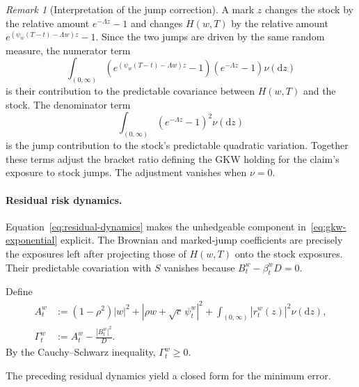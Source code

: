 \documentclass[11pt]{article}
\theoremstyle{definition}
\theoremstyle{remark}
\newtheorem{remark}[theorem]{Remark}
\newcommand{\1}{\mathbf{1}}
\newcommand{\dd}{\mathrm{d}}
\begin{document}

\begin{remark}[Interpretation of the jump correction]
A mark $z$ changes the stock by the relative amount $e^{-\Lambda z}-1$ and
changes $H(w,T)$ by the relative amount
$e^{(\psi_w(T-t)-\Lambda w)z}-1$. Since the two jumps are driven by the same
random measure, the numerator term
\[
 \int_{(0,\infty)}
   \left(e^{(\psi_w(T-t)-\Lambda w)z}-1\right)
   \left(e^{-\Lambda z}-1\right)\nu(\dd z)
\]
is their contribution to the predictable covariance between $H(w,T)$ and the
stock. The denominator term
\[
 \int_{(0,\infty)}
   \left(e^{-\Lambda z}-1\right)^2\nu(\dd z)
\]
is the jump contribution to the stock's predictable quadratic variation.
Together these terms adjust the bracket ratio defining the GKW holding for the
claim's exposure to stock jumps. The adjustment vanishes when $\nu=0$.
\end{remark}

\paragraph{Residual risk dynamics.}
Equation~\eqref{eq:residual-dynamics} makes the unhedgeable component
in~\eqref{eq:gkw-exponential} explicit.
The Brownian and marked-jump coefficients are precisely the exposures left
after projecting those of $H(w,T)$ onto the stock exposures. Their predictable
covariation with $S$ vanishes because $B_t^w-\beta_t^wD=0$.

Define
\begin{align}
 A_t^w
 &:=(1-\rho^2)|w|^2+|\rho w+\sqrt c\,\psi_t^w|^2
    +\int_{(0,\infty)}|r_t^w(z)|^2\nu(\dd z),
 \label{eq:A-def}\\
 \Gamma_t^w&:=A_t^w-\frac{|B_t^w|^2}{D}.
 \label{eq:Gamma-def}
\end{align}
By the Cauchy--Schwarz inequality, $\Gamma_t^w\ge0$.

The preceding residual dynamics yield a closed form for the minimum error.
\end{document}
